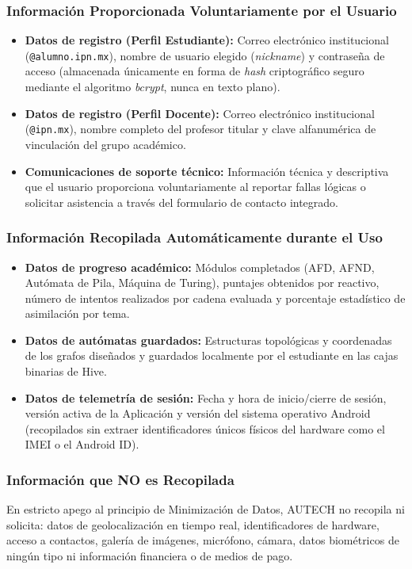 \subsubsection{Información Proporcionada Voluntariamente por el Usuario}
\begin{itemize}
    \item \textbf{Datos de registro (Perfil Estudiante):} Correo electrónico institucional (\texttt{@alumno.ipn.mx}), nombre de usuario elegido (\textit{nickname}) y contraseña de acceso (almacenada únicamente en forma de \textit{hash} criptográfico seguro mediante el algoritmo \textit{bcrypt}, nunca en texto plano).
    \item \textbf{Datos de registro (Perfil Docente):} Correo electrónico institucional (\texttt{@ipn.mx}), nombre completo del profesor titular y clave alfanumérica de vinculación del grupo académico.
    \item \textbf{Comunicaciones de soporte técnico:} Información técnica y descriptiva que el usuario proporciona voluntariamente al reportar fallas lógicas o solicitar asistencia a través del formulario de contacto integrado.
\end{itemize}

\subsubsection{Información Recopilada Automáticamente durante el Uso}
\begin{itemize}
    \item \textbf{Datos de progreso académico:} Módulos completados (AFD, AFND, Autómata de Pila, Máquina de Turing), puntajes obtenidos por reactivo, número de intentos realizados por cadena evaluada y porcentaje estadístico de asimilación por tema.
    \item \textbf{Datos de autómatas guardados:} Estructuras topológicas y coordenadas de los grafos diseñados y guardados localmente por el estudiante en las cajas binarias de Hive.
    \item \textbf{Datos de telemetría de sesión:} Fecha y hora de inicio/cierre de sesión, versión activa de la Aplicación y versión del sistema operativo Android (recopilados sin extraer identificadores únicos físicos del hardware como el IMEI o el Android ID).
\end{itemize}

\subsubsection{Información que NO es Recopilada}
En estricto apego al principio de Minimización de Datos, AUTECH no recopila ni solicita: datos de geolocalización en tiempo real, identificadores de hardware, acceso a contactos, galería de imágenes, micrófono, cámara, datos biométricos de ningún tipo ni información financiera o de medios de pago.

